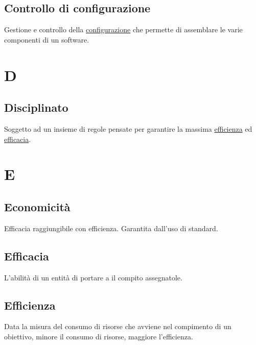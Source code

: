 	\subsection{Controllo di configurazione}
	\label{sec:controlloconfigurazione}
	Gestione e controllo della \hyperref[sec:configurazione]{configurazione} che permette di assemblare le varie componenti di un software.\newpage

	
	\section{D}

	\subsection{Disciplinato}
	\label{sec:disciplinato}
	Soggetto ad un insieme di regole pensate per garantire la massima \hyperref[sec:efficienza]{efficienza} ed \hyperref[sec:efficacia]{efficacia}.\newpage

	
	\section{E}

	\subsection{Economicità}
	\label{sec:economicita}
	Efficacia raggiungibile con efficienza. Garantita dall'uso di standard.
	
	\subsection{Efficacia}
	\label{sec:efficacia}
	L'abilità di un entità di portare a il compito assegnatole.
	
	\subsection{Efficienza}
	\label{sec:efficienza}
	Data la misura del consumo di risorse che avviene nel compimento di un obiettivo, minore il consumo di risorse, maggiore l'efficienza.\newpage


